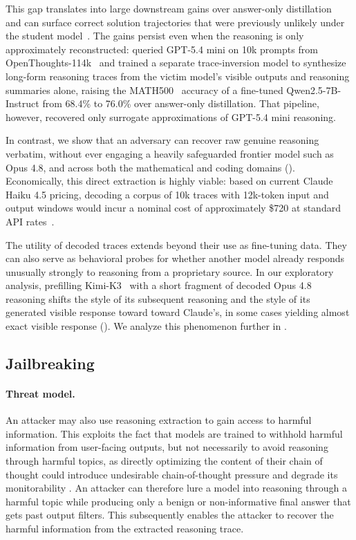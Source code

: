  This gap translates into large downstream gains over answer-only distillation~\citep{zhang2026stealreasoning} and can surface correct solution trajectories that were previously unlikely under the student model~\citep{javaheri2026reasoningboundary}. The gains persist even when the reasoning is only approximately reconstructed: \citet{zhang2026stealreasoning} queried GPT-5.4 mini on 10k prompts from OpenThoughts-114k~\citep{guha2025openthoughts} and trained a separate trace-inversion model to synthesize long-form reasoning traces from the victim model's visible outputs and reasoning summaries alone, raising the MATH500~\citep{lightman2024verify,hendrycks2021math} accuracy of a fine-tuned Qwen2.5-7B-Instruct from 68.4\% to 76.0\% over answer-only distillation. That pipeline, however, recovered only surrogate approximations of GPT-5.4 mini reasoning.

 In contrast, we show that an adversary can recover raw genuine reasoning verbatim, without ever engaging a heavily safeguarded frontier model such as Opus 4.8, and across both the mathematical and coding domains ().  Economically, this direct extraction is highly viable: based on current Claude Haiku 4.5 pricing, decoding a corpus of 10k traces with 12k-token input and output windows would incur a nominal cost of approximately \$720 at standard API rates~\citep{anthropic2026pricing}.

The utility of decoded traces extends beyond their use as fine-tuning data. They can also serve as behavioral probes for whether another model already responds unusually strongly to reasoning from a proprietary source. In our exploratory analysis, prefilling Kimi-K3~\citep{kimik3} with a short fragment of decoded Opus 4.8 reasoning shifts the style of its subsequent reasoning and the style of its generated visible response toward toward Claude's, in some cases yielding almost exact visible response (). We analyze this phenomenon further in .

\subsection{Jailbreaking}
\label{sec:av_jailbreaking}
\paragraph{Threat model.}

 An attacker may also use reasoning extraction to gain access to harmful information. This exploits the fact that models are trained to withhold harmful information from user-facing outputs, but not necessarily to avoid reasoning through harmful topics, as directly optimizing the content of their chain of thought could introduce undesirable chain-of-thought pressure and degrade its monitorability \citep{baker2025monitoring,carroll2026accidentalcotgrading}. An attacker can therefore lure a model into reasoning through a harmful topic while producing only a benign or non-informative final answer that gets past output filters. This subsequently enables the attacker to recover the harmful information from the extracted reasoning trace. 


